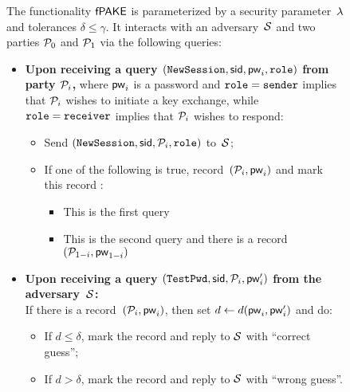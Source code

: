 \begin{figure}[tb]
  \centering
  \begin{fboxenv}
    \begin{minipage}{0.95\textwidth}
      The functionality $\textsf{fPAKE}$ is parameterized by a security parameter~$\lambda$ and tolerances $\delta\leq\gamma$.
      It interacts with an adversary~$\mathcal{S}$ and two parties $\mathcal{P}_{0}$ and $\mathcal{P}_{1}$ via the following queries:\\[-1.8em]
      \begin{itemize}
      \item
        \textbf{Upon receiving a query
        $(\texttt{NewSession},\mathsf{sid},\mathsf{pw}_{i},\texttt{role})$ from party $\mathcal{P}_{i}$,}
        where $\mathsf{pw}_{i}$ is a password and $\texttt{role} = \texttt{sender}$ implies that $\mathcal{P}_{i}$ wishes to initiate a key exchange, while $\texttt{role} = \texttt{receiver}$ implies that $\mathcal{P}_{i}$ wishes to respond:
        \begin{itemize}
          \item Send $(\texttt{NewSession},\mathsf{sid},\mathcal{P}_{i},\texttt{role})$ to~$\mathcal{S}$;
          \item If one of the following is true, record~$(\mathcal{P}_{i},\mathsf{pw}_{i})$ and mark this record :
          \begin{itemize}
             \item This is the first \NewSession query %
             \item This is the second \NewSession query %
             and there is a record~$(\mathcal{P}_{1-i},\mathsf{pw}_{1-i})$
          \end{itemize}
        \end{itemize}
      \item
        \textbf{Upon receiving a query
        $(\texttt{TestPwd},\mathsf{sid},\mathcal{P}_{i},\mathsf{pw}_{i}')$ from the adversary~$\mathcal{S}$:} \\
        If there is a  record~$(\mathcal{P}_{i},\mathsf{pw}_{i})$, then set $d\gets d(\mathsf{pw}_{i},\mathsf{pw}_{i}')$ and do:
        \begin{itemize}
        	  \item If $d \leq \delta$, mark the record  and reply to $\mathcal{S}$ with ``correct guess'';
          \item If $d > \delta$, mark the record  and reply to $\mathcal{S}$ with ``wrong guess''.
        \end{itemize}

\end{itemize}
\end{minipage}
\end{fboxenv}
\end{figure}
